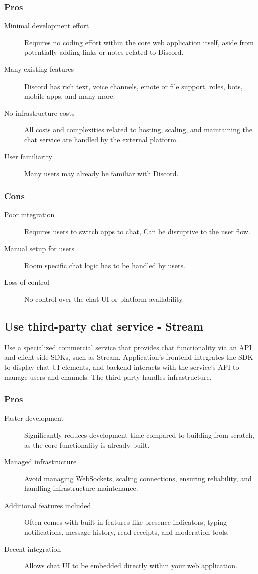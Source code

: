 \documentclass[]{VUMIFTemplateClass}
\begin{document}
\subsubsection{Pros}
\begin{description}
    \item[Minimal development effort] Requires no coding effort within the core web application itself, aside from potentially adding links or notes related to Discord.
    \item[Many existing features] Discord has rich text, voice channels, emote or file support, roles, bots, mobile apps, and many more.
    \item[No infrastructure costs] All costs and complexities related to hosting, scaling, and maintaining the chat service are handled by the external platform.
    \item[User familiarity] Many users may already be familiar with Discord.
\end{description}
\subsubsection{Cons}
\begin{description}
    \item[Poor integration] Requires users to switch apps to chat, Can be disruptive to the user flow.
    \item[Manual setup for users] Room specific chat logic has to be handled by users.
    \item[Loss of control] No control over the chat UI or platform availability.
\end{description}


\subsection{Use third-party chat service - Stream}
Use a specialized commercial service that provides chat functionality  via an API and client-side SDKs, such as Stream. Application's frontend integrates the SDK to display chat UI elements, and backend interacts with the service's API to manage users and channels. The third party handles infrastructure.
\subsubsection{Pros}
\begin{description}
    \item[Faster development] Significantly reduces development time compared to building from scratch, as the core functionality is already built.
    \item[Managed infrastructure] Avoid managing WebSockets, scaling connections, ensuring reliability, and handling infrastructure maintenance.
    \item[Additional features included] Often comes with built-in features like presence indicators, typing notifications, message history, read receipts, and moderation tools.
    \item[Decent integration] Allows chat UI to be embedded directly within your web application.
\end{description}
\end{document}
